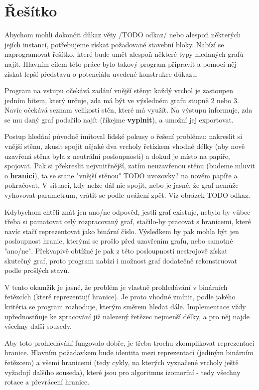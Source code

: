 
\chapter{Řešítko}
Abychom mohli dokončit důkaz věty /TODO odkaz/ nebo alespoň některých jejích instancí, potřebujeme získat požadované stavební bloky. Nabízí se naprogramovat řešítko, které bude umět alespoň některé typy hledaných grafů najít. Hlavním cílem této práce bylo takový program připravit a pomocí něj získat lepší představu o potenciálu uvedené konstrukce důkazu.

Program na vstupu očekává zadání vnější stěny: každý vrchol je zastoupen jedním bitem, který určuje, zda má být ve výsledném grafu stupně 2 nebo 3. Navíc očekává seznam velikostí stěn, které má využít. Na výstupu informuje, zda se mu daný graf podařilo najít (říkejme \textbf{vyplnit}), a umožní jej exportovat.

Postup hledání původně imitoval lidské pokusy o řešení problému: nakreslit si vnější stěnu, zkusit spojit nějaké dva vrcholy řetízkem vhodné délky (aby nově uzavřená stěna byla z neutrální posloupnosti) a dokud je místo na papíře, spojovat. Pak si překreslit nejvnitřnější, zatím neuzavřenou stěnu (budeme mluvit o \textbf{hranici}), ta se stane "vnější stěnou" TODO uvozovky? na novém papíře a pokračovat. V situaci, kdy nelze dál nic spojit, nebo je jasné, že graf nemůže vyhovovat parametrům, vrátit se podle uvážení zpět. Viz obrázek TODO odkaz.

Kdybychom chtěli znát jen ano/ne odpověď, jestli graf existuje, nebylo by vůbec třeba si pamatovat celý rozpracovaný graf, stačilo-by pracovat s hranicemi, které navíc stačí reprezentovat jako binární číslo. Výsledkem by pak mohla být jen posloupnost hranic, kterými se prošlo před uzavřením grafu, nebo samotné "ano/ne". Překvapivě obtížné je pak z této posloupnosti nestrojově získat skutečný graf, proto program nabízí i možnost graf dodatečně rekonstruovat podle prošlých stavů.

V tento okamžik je jasné, že problém je vlastně prohledávání v binárních řetězcích (které reprezentují hranice). Je proto vhodné zmínit, podle jakého kritéria se program rozhoduje, kterým směrem hledat dále. Implementace vždy upřednostňuje ke zpracování již nalezený řetězec nejmenší délky, a pro něj najde všechny další sousedy.

Aby toto prohledávání fungovalo dobře, je třeba trochu zkomplikovat reprezentaci hranice. Hlavním požadavkem bude identita mezi reprezentací (jediným binárním řetězcem) a všemi hranicemi (tedy cykly, na kterých vyznačené vrcholy ještě vyžadují dalšího souseda), které jsou pro algoritmus izomorfní - tedy všechny rotace a převrácení hranice.

